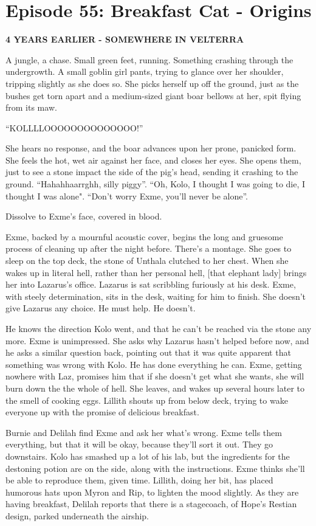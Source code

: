\section{Episode 55: Breakfast Cat - Origins}

\textbf{4 YEARS EARLIER - SOMEWHERE IN VELTERRA} \medskip

A jungle, a chase. Small green feet, running. Something crashing through the undergrowth. A small goblin girl pants, trying to glance over her shoulder, tripping slightly as she does so. She picks herself up off the ground, just as the bushes get torn apart and a medium-sized giant boar bellows at her, spit flying from its maw.\medskip

“KOLLLLOOOOOOOOOOOOOO!”\medskip

She hears no response, and the boar advances upon her prone, panicked form. She feels the hot, wet air against her face, and closes her eyes. She opens them, just to see a stone impact the side of the pig’s head, sending it crashing to the ground. “Hahahhaarrghh, silly piggy”. “Oh, Kolo, I thought I was going to die, I thought I was alone". “Don’t worry Exme, you’ll never be alone”. \medskip

Dissolve to Exme’s face, covered in blood.\medskip

Exme, backed by a mournful acoustic cover, begins the long and gruesome process of cleaning up after the night before. There’s a montage. She goes to sleep on the top deck, the stone of Unthala clutched to her chest. When she wakes up in literal hell, rather than her personal hell, [that elephant lady] brings her into Lazarus’s office. Lazarus is sat scribbling furiously at his desk. Exme, with steely determination, sits in the desk, waiting for him to finish. She doesn’t give Lazarus any choice. He must help. He doesn’t.\medskip

He knows the direction Kolo went, and that he can’t be reached via the stone any more. Exme is unimpressed. She asks why Lazarus hasn’t helped before now, and he asks a similar question back, pointing out that it was quite apparent that something was wrong with Kolo. He has done everything he can. Exme, getting nowhere with Laz, promises him that if she doesn't get what she wants, she will burn down the the whole of hell. She leaves, and wakes up several hours later to the smell of cooking eggs. Lillith shouts up from below deck, trying to wake everyone up with the promise of delicious breakfast.\medskip

Burnie and Delilah find Exme and ask her what’s wrong. Exme tells them everything, but that it will be okay, because they’ll sort it out. They go downstairs. Kolo has smashed up a lot of his lab, but the ingredients for the destoning potion are on the side, along with the instructions. Exme thinks she'll be able to reproduce them, given time. Lillith, doing her bit, has placed humorous hats upon Myron and Rip, to lighten the mood slightly. As they are having breakfast, Delilah reports that there is a stagecoach, of Hope’s Restian design, parked underneath the airship.\medskip

